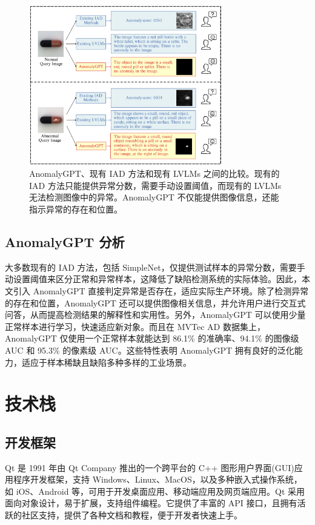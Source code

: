 \documentclass[
  ]{njuthesis}
\begin{document}
\begin{figure}[ht]
    \centering
    \includegraphics[width=0.75\textwidth]{images/AnomalyGPT、IAD、LVLMs比较图.png}
    \caption{AnomalyGPT、现有 IAD 方法和现有 LVLMs 之间的比较。现有的 IAD 方法只能提供异常分数，需要手动设置阈值，而现有的 LVLMs 无法检测图像中的异常。AnomalyGPT 不仅能提供图像信息，还能指示异常的存在和位置。}
    \label{AnomalyGPT比较图}
\end{figure}


\subsection{AnomalyGPT 分析}

大多数现有的 IAD 方法，包括 SimpleNet，仅提供测试样本的异常分数，需要手动设置阈值来区分正常和异常样本，这降低了缺陷检测系统的实际体验。因此，本文引入 AnomalyGPT 直接判定异常是否存在，适应实际生产环境。除了检测异常的存在和位置，AnomalyGPT 还可以提供图像相关信息，并允许用户进行交互式问答，从而提高检测结果的解释性和实用性。另外，AnomalyGPT 可以使用少量正常样本进行学习，快速适应新对象。而且在 MVTec AD 数据集上，AnomalyGPT 仅使用一个正常样本就能达到 86.1\% 的准确率、94.1\% 的图像级 AUC 和 95.3\% 的像素级 AUC。这些特性表明 AnomalyGPT 拥有良好的泛化能力，适应于样本稀缺且缺陷多种多样的工业场景。

\section{技术栈}

\subsection{开发框架}

Qt 是 1991 年由 Qt Company 推出的一个跨平台的 C++ 图形用户界面(GUI)应用程序开发框架，支持 Windows、Linux、MacOS，以及多种嵌入式操作系统，如 iOS、Android 等，可用于开发桌面应用、移动端应用及网页端应用。Qt 采用面向对象设计，易于扩展，支持组件编程。它提供了丰富的 API 接口，且拥有活跃的社区支持，提供了各种文档和教程，便于开发者快速上手。
\end{document}
